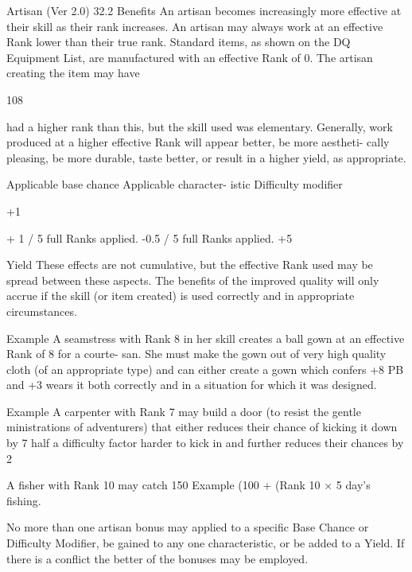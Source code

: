 \begin{Chapter}{Artisan (Ver 2.0)}
32.2 Benefits 
An  artisan  becomes  increasingly  more  effective  at 
their  skill  as  their  rank  increases.  An  artisan  may 
always  work  at an  effective  Rank  lower  than  their 
true  rank.  Standard  items,  as  shown  on  the  DQ 
Equipment List, are manufactured with an effective 
Rank of 0. The artisan creating the item may have 

108 

had  a  higher  rank than this,  but  the  skill  used  was 
elementary.  Generally,  work  produced  at  a  higher 
effective Rank will appear better, be more aestheti-
cally  pleasing,  be  more  durable,  taste  better,  or 
result in a higher yield, as appropriate. 

Applicable base 
chance  
Applicable character-
istic 
Difficulty modifier 

+1%

+ 1 / 5 full Ranks 
applied.  
-0.5 / 5 full Ranks 
applied. 
+5%

Yield  
These  effects  are  not  cumulative,  but  the  effective 
Rank  used  may  be  spread  between  these  aspects. 
The  benefits  of  the  improved  quality  will  only 
accrue if the skill (or item created) is used correctly 
and in appropriate circumstances. 

Example 
A  seamstress  with  Rank  8  in  her  skill 
creates a ball gown at an effective Rank of 8 for a courte-
san.  She  must  make  the  gown  out  of  very  high  quality 
cloth (of an appropriate type) and can either create a gown 
which  confers  +8%
PB and +3%
wears it  both correctly and  in a situation  for which  it  was 
designed. 

Example 
A carpenter with Rank 7  may build a  door 
(to  resist  the  gentle  ministrations  of  adventurers)  that 
either reduces their chance of kicking it down by 7%
half a difficulty factor harder to kick in and further reduces 
their chances by 2%

A  fisher  with  Rank  10  may  catch  150%
Example 
(100 + (Rank 10 × 5%
day’s fishing. 

No  more  than  one  artisan  bonus  may  applied  to  a 
specific  Base  Chance  or  Difficulty  Modifier,  be 
gained  to  any  one  characteristic,  or  be  added  to  a 
Yield. If there is a conflict the better of the bonuses 
may be employed. 


\end{Chapter}

